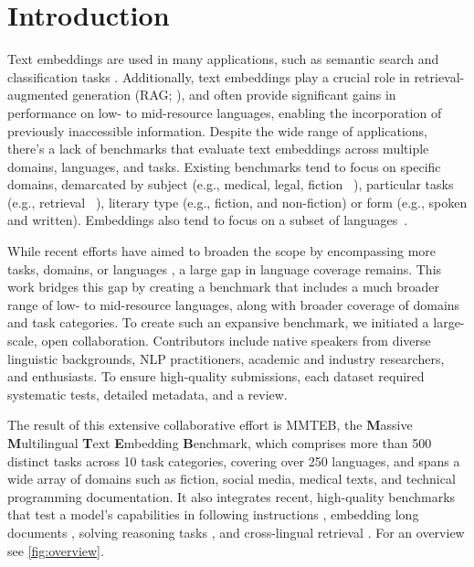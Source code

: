 \section{Introduction}
\label{sec:intro}
Text embeddings are used in many applications, such as semantic search \citep{reimers2019sentencebert,muennighoff2022sgpt, hendriksen2023scene,winata2023efficient,winata2024miners} and classification tasks \citep{wang-etal-2018-glue,wang2019superglue}. Additionally, text embeddings play a crucial role in retrieval-augmented generation (RAG; \citealt{borgeaud2022improving,lewis2021retrievalaugmentedgenerationknowledgeintensivenlp}), and often provide significant gains in performance on low- to mid-resource languages, enabling the incorporation of previously inaccessible information. Despite the wide range of applications, there's a lack of benchmarks that evaluate text embeddings across multiple domains, languages, and tasks.
Existing benchmarks tend to focus on specific domains, demarcated by subject (e.g., medical, legal, fiction ~\citep{thorne2018fever}), particular tasks (e.g., retrieval ~\citep{thakur2021beir}), literary type (e.g., fiction, and non-fiction) 
 or form (e.g., spoken and written).  Embeddings also tend to focus on a subset of languages~\citep{norregaard-derczynski-2021-danfever}.


While recent efforts \citep{thakur2021beir, muennighoff2023mteb, zhang2022making} have aimed to broaden the scope by encompassing more tasks, domains, or languages \citep{cohan2020specter, wrzalik-krechel-2021-gerdalir}, a large gap in language coverage remains. This work bridges this gap by creating a benchmark that includes a much broader range of low- to mid-resource languages, along with broader coverage of domains and task categories.
To create such an expansive benchmark, we initiated a large-scale, open collaboration. Contributors include native speakers from diverse linguistic backgrounds, NLP practitioners, academic and industry researchers, and enthusiasts. To ensure high-quality submissions, each dataset required systematic tests, detailed metadata, and a review.

The result of this extensive collaborative effort is MMTEB, the \textbf{M}assive \textbf{M}ultilingual \textbf{T}ext \textbf{E}mbedding \textbf{B}enchmark, which comprises more than 500 distinct tasks across 10 task categories, covering over 250 languages, and spans a wide array of domains such as fiction, social media, medical texts, and technical programming documentation. It also integrates recent, high-quality benchmarks that test a model's capabilities in following instructions \citep{winata2021language,weller2024followir}, embedding long documents \citep{zhu2024longembed}, solving reasoning tasks \citep{xiao2024rar,su2024brightrealisticchallengingbenchmark}, and cross-lingual retrieval \citep{franco-salvador-etal-2014-knowledge}. For an overview see \autoref{fig:overview}.

